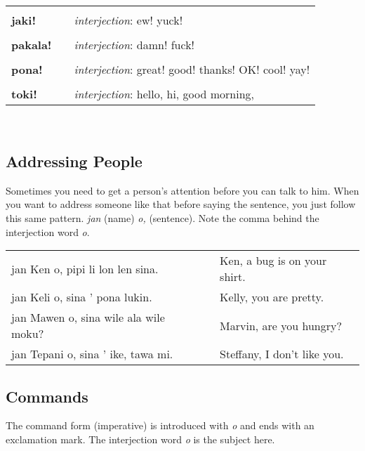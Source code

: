\begin{supertabular}{p{2,5cm}|ll}
 && \\ %
\textbf{jaki!} && \textit{interjection}: ew! yuck! \\ %
 && \\ %
\textbf{pakala!} && \textit{interjection}: damn! fuck! \\ %
 && \\ %
\textbf{pona!} && \textit{interjection}: great! good! thanks! OK! cool! yay! \\ %
 && \\ %
\textbf{toki!} && \textit{interjection}: hello, hi, good morning, \\ %
\end{supertabular} \\
%
%
\newpage
{}
\subsection*{Addressing People}
%
Sometimes you need to get a person's attention before you can talk to him. 
When you want to address someone like that before saying the sentence, you just follow this same pattern. 
\textit{jan} (name) \textit{o,} (sentence). 
Note the comma behind the interjection word \textit{o}. 

\begin{supertabular}{p{5,5cm}|ll}
jan Ken o, pipi li lon len sina. && Ken, a bug is on your shirt. \\
jan Keli o, sina ' pona lukin. && Kelly, you are pretty. \\
jan Mawen o, sina wile ala wile moku? && Marvin, are you hungry? \\
jan Tepani o, sina ' ike, tawa mi. && Steffany, I don't like you. \\
\end{supertabular} 
%
\subsection*{Commands}
%
The command form (imperative) is introduced with \textit{o} and ends with an exclamation mark.
The interjection word \textit{o} is the subject here.

